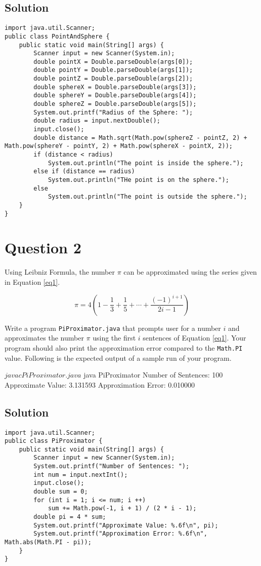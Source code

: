 \subsection*{Solution}
\lstset{language=Java,tabsize=2}
\begin{lstlisting}
import java.util.Scanner;
public class PointAndSphere {
	public static void main(String[] args) {
		Scanner input = new Scanner(System.in);
		double pointX = Double.parseDouble(args[0]);
		double pointY = Double.parseDouble(args[1]);
		double pointZ = Double.parseDouble(args[2]);
		double sphereX = Double.parseDouble(args[3]);
		double sphereY = Double.parseDouble(args[4]);
		double sphereZ = Double.parseDouble(args[5]);
		System.out.printf("Radius of the Sphere: ");
		double radius = input.nextDouble();
		input.close();
		double distance = Math.sqrt(Math.pow(sphereZ - pointZ, 2) + Math.pow(sphereY - pointY, 2) + Math.pow(sphereX - pointX, 2));
		if (distance < radius)
			System.out.println("The point is inside the sphere.");
		else if (distance == radius)
			System.out.println("THe point is on the sphere.");
		else
			System.out.println("The point is outside the sphere.");
	}
}
\end{lstlisting}

\section*{Question 2}
Using Leibniz Formula, the number $\pi$ can be approximated using the series given in Equation \ref{eq1}.

\begin{equation}
\pi = 4 \left( 1 - \frac{1}{3} + \frac{1}{5} + \cdots + \frac{(-1)^{i+1}}{2i-1} \right)
\label{eq1}
\end{equation}

Write a program \texttt{PiProximator.java} that prompts user for a number $i$ and approximates the number $\pi$ using the first $i$ sentences of Equation \ref{eq1}.
Your program should also print the approximation error compared to the \texttt{Math.PI} value.
Following is the expected output of a sample run of your program.

\begin{terminal}
$ javac PiProximator.java
$ java PiProximator
Number of Sentences: 100
Approximate Value: 3.131593
Approximation Error: 0.010000
\end{terminal}

\subsection*{Solution}
\lstset{language=Java,tabsize=2}
\begin{lstlisting}
import java.util.Scanner;
public class PiProximator {
	public static void main(String[] args) {
		Scanner input = new Scanner(System.in);
		System.out.printf("Number of Sentences: ");
		int num = input.nextInt();
		input.close();
		double sum = 0;
		for (int i = 1; i <= num; i ++)
			sum += Math.pow(-1, i + 1) / (2 * i - 1);
		double pi = 4 * sum;
		System.out.printf("Approximate Value: %.6f\n", pi);
		System.out.printf("Approximation Error: %.6f\n", Math.abs(Math.PI - pi));
	}
}
\end{lstlisting}

